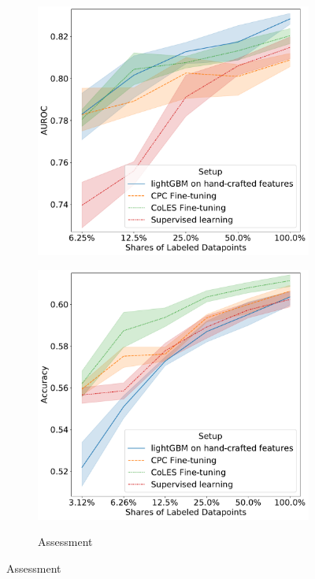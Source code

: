\documentclass[sigconf]{acmart}
\begin{document}
\begin{figure}
\begin{subfigure}{0.5\linewidth}
    \includegraphics[width=\linewidth]{figures/ss_rosbank_per.pdf}
    \label{fig-semi-churn}
  \end{subfigure}
  \begin{subfigure}{0.5\linewidth}
    \caption{Assessment}
    \includegraphics[width=\linewidth]{figures/ss_bowl2019_per.pdf}
    \label{fig-semi-assessment2}

\end{subfigure}
\end{figure}
\end{document}
